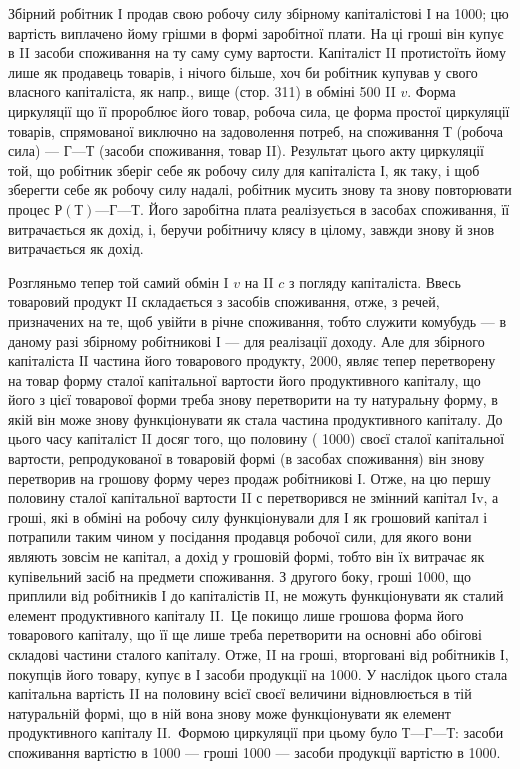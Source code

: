 
Збірний робітник І продав свою робочу силу збірному капіталістові
І на 1000; цю вартість виплачено йому грішми в формі заробітної плати.
На ці гроші він купує в II засоби споживання на ту саму суму
вартости. Капіталіст II протистоїть йому лише як продавець товарів, і
нічого більше, хоч би робітник купував у свого власного капіталіста, як
напр., вище (стор. 311) в обміні 500 II $v$. Форма циркуляції що її пророблює
його товар, робоча сила, це форма простої циркуляції товарів, спрямованої
виключно на задоволення потреб, на споживання $Т$ (робоча сила) —
$Г — Т$ (засоби споживання, товар II). Результат цього акту циркуляції
той, що робітник зберіг себе як робочу силу для капіталіста І, як таку,
і щоб зберегти себе як робочу силу надалі, робітник мусить знову та
знову повторювати процес $Р (Т) — Г — Т$. Його заробітна плата реалізується
в засобах споживання, її витрачається як дохід, і, беручи
робітничу клясу в цілому, завжди знову й знов витрачається як дохід.

Розгляньмо тепер той самий обмін I $v$ на II $c$ з погляду капіталіста. Ввесь
товаровий продукт II складається з засобів споживання, отже, з речей,
призначених на те, щоб увійти в річне споживання, тобто служити комубудь
— в даному разі збірному робітникові І — для реалізації доходу. Але
для збірного капіталіста ІI частина його товарового продукту, \deq{} 2000,
являє тепер перетворену на товар форму сталої капітальної вартости
його продуктивного капіталу, що його з цієї товарової форми треба
знову перетворити на ту натуральну форму, в якій він може знову
функціонувати як стала частина продуктивного капіталу. До цього часу
капіталіст II досяг того, що половину (\deq{} 1000) своєї сталої капітальної
вартости, репродукованої в товаровій формі (в засобах споживання) він
знову перетворив на грошову форму через продаж робітникові І. Отже,
на цю першу половину сталої капітальної вартости II с перетворився не
змінний капітал Іv, а гроші, які в обміні на робочу силу функціонували
для І як грошовий капітал і потрапили таким чином у посідання продавця
робочої сили, для якого вони являють зовсім не капітал, а дохід
у грошовій формі, тобто він їх витрачає як купівельний засіб на предмети
споживання. З другого боку, гроші \deq{} 1000, що приплили від робітників
І до капіталістів II, не можуть функціонувати як сталий елемент
продуктивного капіталу II.~Це покищо лише грошова форма його товарового
капіталу, що її ще лише треба перетворити на основні або обігові
складові частини сталого капіталу. Отже, II на гроші, вторговані від
робітників І, покупців його товару, купує в І засоби продукції на 1000.
У наслідок цього стала капітальна вартість II на половину всієї своєї
величини відновлюється в тій натуральній формі, що в ній вона знову
може функціонувати як елемент продуктивного капіталу II.~Формою
циркуляції при цьому було $Т — Г — Т$: засоби споживання вартістю в 1000 —
гроші \deq{} 1000 — засоби продукції вартістю в 1000.

